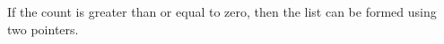 \documentclass[preview]{standalone}
\begin{document}
If the count is greater than or equal to zero, then the list can be formed using two pointers.\\
\end{document}
